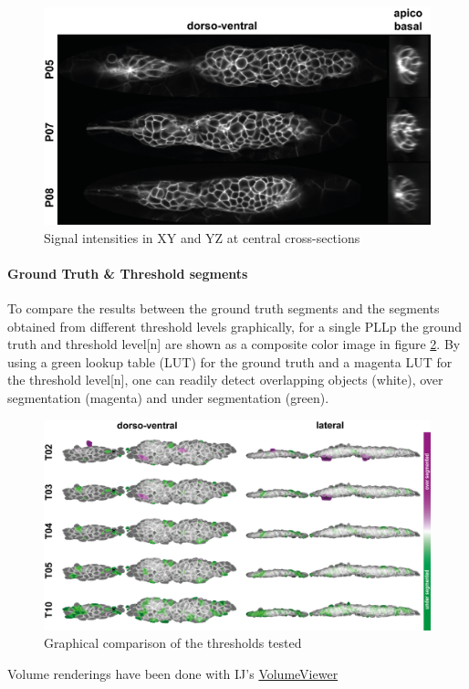 \documentclass[11pt,singlespacinge,twoside]{reedthesis} %
\begin{document}
\begin{figure}

{\centering \includegraphics[width=0.5\linewidth]{figure/02-MaMo/GrTr/Morphology/signals} 

}

\caption{Signal intensities in XY and YZ at central cross-sections}\label{fig:stackmem}
\end{figure}
\hypertarget{ground-truth-threshold-segments}{%
\paragraph{Ground Truth \& Threshold segments}\label{ground-truth-threshold-segments}}

To compare the results between the ground truth segments and the segments obtained from different threshold levels graphically, for a single PLLp the ground truth and threshold level{[}n{]} are shown as a composite color image in figure \ref{fig:stackcomp}. By using a green lookup table (LUT) for the ground truth and a magenta LUT for the threshold level{[}n{]}, one can readily detect overlapping objects (white), over segmentation (magenta) and under segmentation (green).


\begin{figure}

{\centering \includegraphics[width=0.75\linewidth]{figure/02-MaMo/GrTr/Morphology/volumes} 

}

\caption{Graphical comparison of the thresholds tested}\label{fig:stackcomp}
\end{figure}
\noindent Volume renderings have been done with IJ's \href{\%22https://github.com/fiji/Volume_Viewer/releases/tag/Volume_Viewer-2.01.2\%22}{VolumeViewer}
\end{document}
